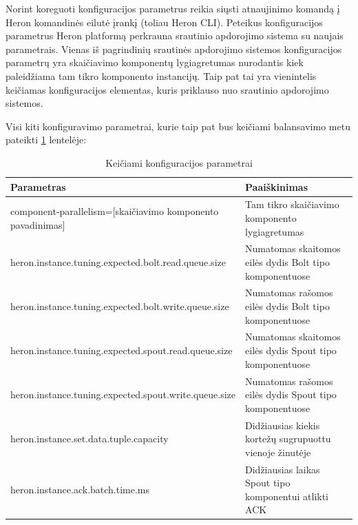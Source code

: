 \documentclass{VUMIFPSbakalaurinis}
\begin{document}
Norint koreguoti konfiguracijos parametrus reikia siųsti atnaujinimo komandą į Heron komandinės eilutė įrankį (toliau Heron CLI). Peteikus konfiguracijos parametrus Heron platformą perkrauna srautinio apdorojimo sistema su naujais parametrais. 
Vienas iš pagrindinių srautinės apdorojimo sistemos konfiguracijos parametrų yra skaičiavimo komponentų lygiagretumas nurodantis kiek paleidžiama tam tikro komponento instancijų. Taip pat tai yra vienintelis keičiamas konfiguracijos elementas, kuris priklauso nuo srautinio apdorojimo sistemos.


Visi kiti konfiguravimo parametrai, kurie taip pat bus keičiami balansavimo metu pateikti \ref{param-table} lentelėje:

\begin{longtable}{|p{0.59\linewidth}|p{0.41\linewidth}|}
    \caption{Keičiami konfiguracijos parametrai}
    \label{param-table}\\
    \hline
    \rowcolor[HTML]{C0C0C0} 
    Parametras                                              & Paaiškinimas                                                                                 \\ \hline
    \endfirsthead
    \endhead
    component-parallelism=[skaičiavimo komponento pavadinimas]            & Tam tikro skaičiavimo komponento lygiagretumas                                 \\ \hline
    heron.instance.tuning.expected.bolt.read.queue.size                   & Numatomas skaitomos eilės dydis Bolt tipo komponentuose                        \\ \hline
    heron.instance.tuning.expected.bolt.write.queue.size                  & Numatomas rašomos eilės dydis Bolt tipo komponentuose                          \\ \hline
    heron.instance.tuning.expected.spout.read.queue.size                  & Numatomas skaitomos eilės dydis Spout tipo komponentuose                       \\ \hline
    heron.instance.tuning.expected.spout.write.queue.size                 & Numatomas rašomos eilės dydis Spout tipo komponentuose                         \\ \hline
    heron.instance.set.data.tuple.capacity                                & Didžiausias kiekis kortežų sugrupuottu vienoje žinutėje                        \\ \hline
    heron.instance.ack.batch.time.ms                                      & Didžiausias laikas Spout tipo komponentui atlikti ACK                          \\ \hline

\end{longtable}
\end{document}
